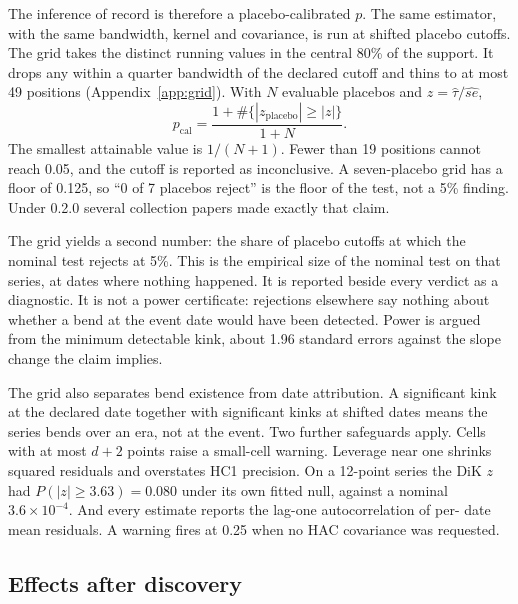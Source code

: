 \documentclass[11pt]{article}
\begin{document}
The inference of record is therefore a placebo-calibrated $p$. The same estimator, with
the same bandwidth, kernel and covariance, is run at shifted placebo cutoffs. The grid takes the distinct running values in the central 80\% of the support. It drops
any within a quarter bandwidth of the declared cutoff and thins to at most 49 positions
(Appendix~\ref{app:grid}). With $N$ evaluable placebos and $z = \hat\tau/\widehat{se}$,
\begin{equation}
p_{\mathrm{cal}} = \frac{1 + \#\{|z_{\mathrm{placebo}}| \ge |z|\}}{1 + N}.
\end{equation}
The smallest attainable value is $1/(N+1)$. Fewer than 19 positions cannot reach 0.05,
and the cutoff is reported as inconclusive. A seven-placebo grid has a floor of 0.125, so
``0 of 7 placebos reject'' is the floor of the test, not a 5\% finding. Under 0.2.0
several collection papers made exactly that claim.

The grid yields a second number: the share of placebo cutoffs at which the nominal test
rejects at 5\%. This is the empirical size of the nominal test on that series, at dates
where nothing happened. It is reported beside every verdict as a diagnostic. It is not a
power certificate: rejections elsewhere say nothing about whether a bend at the event
date would have been detected. Power is argued from the minimum detectable kink, about
1.96 standard errors against the slope change the claim implies.

The grid also separates bend existence from date attribution. A significant kink at the
declared date together with significant kinks at shifted dates means the series bends
over an era, not at the event. Two further safeguards apply. Cells with at most $d+2$ points raise a small-cell warning.
Leverage near one shrinks squared residuals and overstates HC1 precision. On a 12-point
series the DiK $z$ had $P(|z| \ge 3.63) = 0.080$ under its own fitted null, against a
nominal $3.6\times10^{-4}$. And every estimate reports the lag-one autocorrelation of per-
date mean residuals. A warning fires at 0.25 when no HAC covariance was requested.

\subsection{Effects after discovery}\label{sec:effects}
\end{document}
